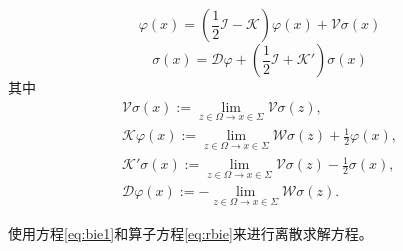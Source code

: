 \begin{equation}
\varphi(x) = (\frac{1}{2} \mathcal {I} - \mathcal{K})\varphi(x) + \mathcal{V}\sigma(x)
\label{eq:bie1}
\end{equation}
\[
\sigma(x) = \mathcal{D}\varphi + (\frac{1}{2} \mathcal {I} + \mathcal{K'})\sigma(x)
\]
其中
\begin{gather*}
	\mathcal{V}\sigma(x) := \lim_{z \in \Omega \rightarrow x \in \Sigma}\mathcal{V}\sigma(z),\\
	\mathcal{K}\varphi(x) := \lim_{z \in \Omega \rightarrow x \in \Sigma}\mathcal{W}\sigma(z) + \frac{1}{2}\varphi(x),\\
	\mathcal{K'}\sigma(x) := \lim_{z \in \Omega \rightarrow x \in \Sigma}\mathcal{V}\sigma(z) - \frac{1}{2}\sigma(x),\\
	\mathcal{D}\varphi(x) := -\lim_{z \in \Omega \rightarrow x \in \Sigma}\mathcal{W}\sigma(z).
\end{gather*}

使用方程\eqref{eq:bie1}和算子方程\eqref{eq:rbie}来进行离散求解方程。

